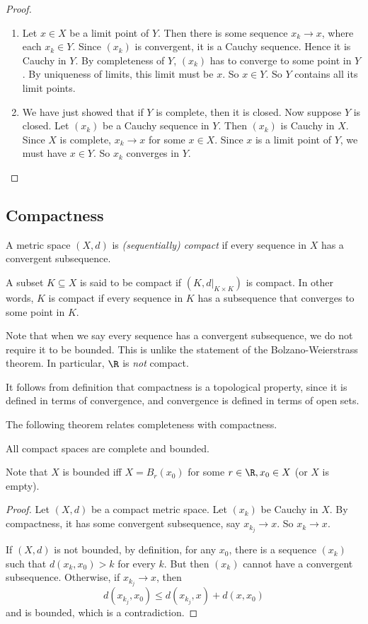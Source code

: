 \documentclass[a4paper]{article}
\begin{document}
\begin{proof}\leavevmode
  \begin{enumerate}
    \item Let $x \in X$ be a limit point of $Y$. Then there is some sequence $x_k \to x$, where each $x_k \in Y$. Since $(x_k)$ is convergent, it is a Cauchy sequence. Hence it is Cauchy in $Y$. By completeness of $Y$, $(x_k)$ has to converge to some point in $Y$. By uniqueness of limits, this limit must be $x$. So $x \in Y$. So $Y$ contains all its limit points.
    \item We have just showed that if $Y$ is complete, then it is closed. Now suppose $Y$ is closed. Let $(x_k)$ be a Cauchy sequence in $Y$. Then $(x_k)$ is Cauchy in $X$. Since $X$ is complete, $x_k\to x$ for some $x \in X$. Since $x$ is a limit point of $Y$, we must have $x \in Y$. So $x_k$ converges in $Y$.
  \end{enumerate}
\end{proof}

\subsection{Compactness}
\begin{defi}
  A metric space $(X, d)$ is \emph{(sequentially) compact} if every sequence in $X$ has a convergent subsequence.

  A subset $K\subseteq X$ is said to be compact if $(K, d|_{K\times K})$ is compact. In other words, $K$ is compact if every sequence in $K$ has a subsequence that converges to some point in $K$.
\end{defi}
Note that when we say every sequence has a convergent subsequence, we do not require it to be bounded. This is unlike the statement of the Bolzano-Weierstrass theorem. In particular, $\R$ is \emph{not} compact.

It follows from definition that compactness is a topological property, since it is defined in terms of convergence, and convergence is defined in terms of open sets.

The following theorem relates completeness with compactness.
\begin{thm}
  All compact spaces are complete and bounded.
\end{thm}
Note that $X$ is bounded iff $X = B_r(x_0)$ for some $r \in \R, x_0 \in X$ (or $X$ is empty).

\begin{proof}
  Let $(X, d)$ be a compact metric space. Let $(x_k)$ be Cauchy in $X$. By compactness, it has some convergent subsequence, say $x_{k_j} \to x$. So $x_k \to x$.

  If $(X, d)$ is not bounded, by definition, for any $x_0$, there is a sequence $(x_k)$ such that $d(x_k, x_0) > k$ for every $k$. But then $(x_k)$ cannot have a convergent subsequence. Otherwise, if $x_{k_j} \to x$, then
  \[
    d(x_{k_j}, x_0) \leq d(x_{k_j}, x) + d(x, x_0)
  \]
  and is bounded, which is a contradiction.
\end{proof}
\end{document}
